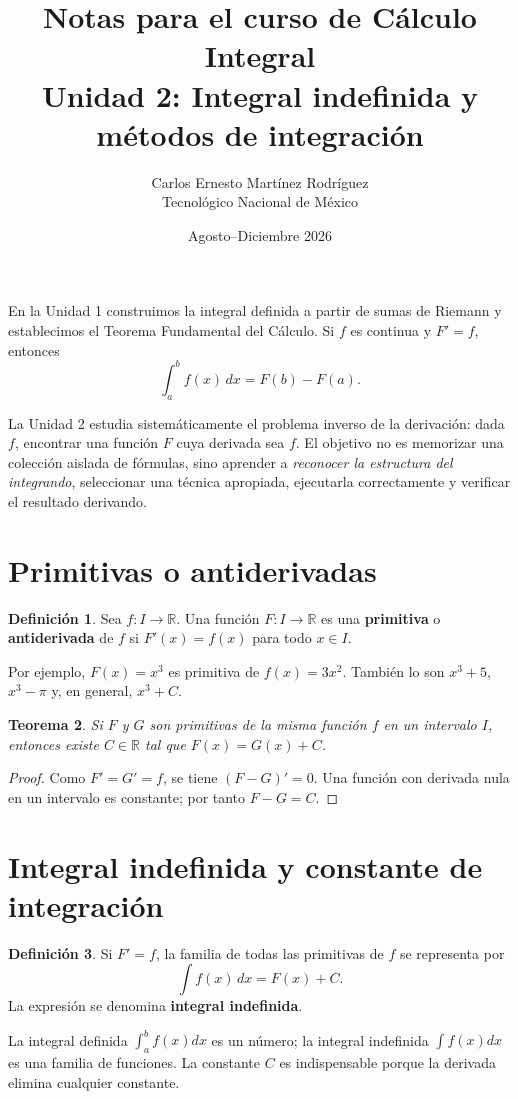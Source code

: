 \documentclass[12pt]{article}
\title{\textbf{Notas para el curso de Cálculo Integral}\\[0.3cm]\Large Unidad 2: Integral indefinida y métodos de integración}
\author{Carlos Ernesto Martínez Rodríguez\\Tecnológico Nacional de México}
\date{Agosto--Diciembre 2026}
\newtheorem{teorema}{Teorema}[section]
\theoremstyle{definition}
\newtheorem{definicion}[teorema]{Definición}
\theoremstyle{remark}
\newcommand{\R}{\mathbb{R}}
\begin{document}
\maketitle
\tableofcontents
\newpage
En la Unidad 1 construimos la integral definida a partir de sumas de Riemann y establecimos el Teorema Fundamental del Cálculo. Si $f$ es continua y $F'=f$, entonces
\[\int_a^b f(x)\,dx=F(b)-F(a).\]

La Unidad 2 estudia sistemáticamente el problema inverso de la derivación: dada $f$, encontrar una función $F$ cuya derivada sea $f$. El objetivo no es memorizar una colección aislada de fórmulas, sino aprender a \emph{reconocer la estructura del integrando}, seleccionar una técnica apropiada, ejecutarla correctamente y verificar el resultado derivando.
\section{Primitivas o antiderivadas}
\begin{definicion}Sea $f:I\to\R$. Una función $F:I\to\R$ es una \textbf{primitiva} o \textbf{antiderivada} de $f$ si $F'(x)=f(x)$ para todo $x\in I$.\end{definicion}
Por ejemplo, $F(x)=x^3$ es primitiva de $f(x)=3x^2$. También lo son $x^3+5$, $x^3-\pi$ y, en general, $x^3+C$.
\begin{teorema}Si $F$ y $G$ son primitivas de la misma función $f$ en un intervalo $I$, entonces existe $C\in\R$ tal que $F(x)=G(x)+C$.\end{teorema}
\begin{proof}Como $F'=G'=f$, se tiene $(F-G)'=0$. Una función con derivada nula en un intervalo es constante; por tanto $F-G=C$.\end{proof}

\section*{Integral indefinida y constante de integración}
\begin{definicion}Si $F'=f$, la familia de todas las primitivas de $f$ se representa por
\[\boxed{\int f(x)\,dx=F(x)+C}.\]
La expresión se denomina \textbf{integral indefinida}.\end{definicion}
La integral definida $\int_a^b f(x)dx$ es un número; la integral indefinida $\int f(x)dx$ es una familia de funciones. La constante $C$ es indispensable porque la derivada elimina cualquier constante.
\end{document}
